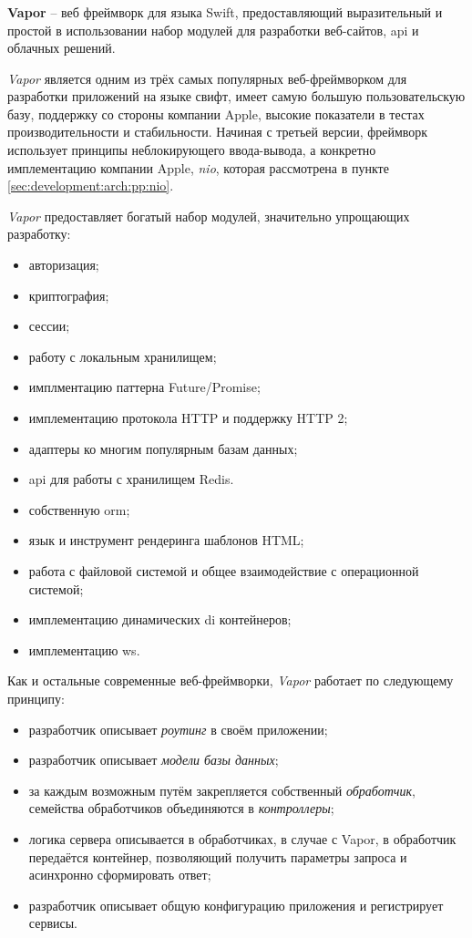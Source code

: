 \subsubsection{}
\label{sec:development:arch:pp:vapor}

\textbf{Vapor} -- веб фреймворк для языка Swift, предоставляющий выразительный и простой в использовании набор модулей для разработки веб-сайтов, \gls{api} и облачных решений\cite{vapor:github}.

\textit{Vapor} является одним из трёх самых популярных веб-фреймворком для разработки приложений на языке свифт, имеет самую большую пользовательскую базу, поддержку со стороны компании Apple, высокие показатели в тестах производительности и стабильности. Начиная с третьей версии, фреймворк использует принципы неблокирующего ввода-вывода, а конкретно имплементацию компании Apple, \textit{nio}, которая рассмотрена в пункте \ref{sec:development:arch:pp:nio}.

\textit{Vapor} предоставляет богатый набор модулей, значительно упрощающих разработку:

\begin{itemize}
	\item авторизация;
	\item криптография;
	\item сессии;
	\item работу с локальным хранилищем;
	\item имплментацию паттерна Future/Promise;
	\item имплементацию протокола HTTP и поддержку HTTP 2;
	\item адаптеры ко многим популярным базам данных;
	\item \gls{api} для работы с хранилищем Redis.
	\item собственную \gls{orm};
	\item язык и инструмент рендеринга шаблонов HTML;
	\item работа с файловой системой и общее взаимодействие с операционной системой;
	\item имплементацию динамических \gls{di} контейнеров;
	\item имплементацию \gls{ws}.
\end{itemize}

Как и остальные современные веб-фреймворки, \textit{Vapor} работает по следующему принципу:
\begin{itemize}
	\item разработчик описывает \textit{роутинг} в своём приложении;
	\item разработчик описывает \textit{модели базы данных};
	\item за каждым возможным путём закрепляется собственный \textit{обработчик}, семейства обработчиков объединяются в \textit{контроллеры};
	\item логика сервера описывается в обработчиках, в случае с Vapor, в обработчик передаётся контейнер, позволяющий получить параметры запроса и асинхронно сформировать ответ;
	\item разработчик описывает общую конфигурацию приложения и регистрирует сервисы.
\end{itemize}

